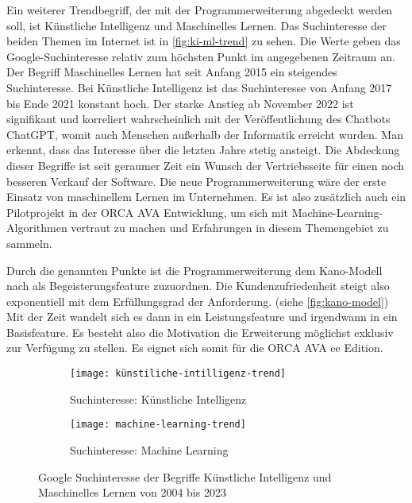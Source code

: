 Ein weiterer Trendbegriff, der mit der Programmerweiterung abgedeckt werden soll, ist \glqq Künstliche Intelligenz\grqq{} und \glqq Maschinelles Lernen\grqq{}. Das Suchinteresse der beiden Themen im Internet ist in \autoref{fig:ki-ml-trend} zu sehen. Die Werte geben das Google-Suchinteresse relativ zum höchsten Punkt im angegebenen Zeitraum an. Der Begriff \glqq Maschinelles Lernen\grqq{} hat seit Anfang 2015 ein steigendes Suchinteresse. Bei \glqq Künstliche Intelligenz\grqq{} ist das Suchinteresse von Anfang 2017 bis Ende 2021 konstant hoch. Der starke Anstieg ab November 2022 ist signifikant und korreliert wahrscheinlich mit der Veröffentlichung des Chatbots ChatGPT, womit auch Menschen außerhalb der Informatik erreicht wurden. Man erkennt, dass das Interesse über die letzten Jahre stetig ansteigt. Die Abdeckung dieser Begriffe ist seit geraumer Zeit ein Wunsch der Vertriebsseite für einen noch besseren Verkauf der Software. Die neue Programmerweiterung wäre der erste Einsatz von maschinellem Lernen im Unternehmen. Es ist also zusätzlich auch ein Pilotprojekt in der ORCA AVA Entwicklung, um sich mit Machine-Learning-Algorithmen vertraut zu machen und Erfahrungen in diesem Themengebiet zu sammeln. 

Durch die genannten Punkte ist die Programmerweiterung dem Kano-Modell nach als Begeisterungsfeature zuzuordnen. Die Kundenzufriedenheit steigt also exponentiell mit dem Erfüllungsgrad der Anforderung. (siehe \autoref{fig:kano-model}) Mit der Zeit wandelt sich es dann in ein Leistungsfeature und irgendwann in ein Basisfeature. \citep[vgl.][p.~3-4]{Hölzing_2008} Es besteht also die Motivation die Erweiterung möglichst exklusiv zur Verfügung zu stellen. Es eignet sich somit für die ORCA AVA \ac{ee} Edition.

\begin{figure}[h]
	\centering
	
	\begin{subfigure}{0.99\textwidth}
		\centering
	\texttt{[image: künstiliche-intilligenz-trend]}
		\caption{Suchinteresse: Künstliche Intelligenz}
		\label{FIG:ki-trend}
	\end{subfigure}
	\hspace{1cm}
	\begin{subfigure}{0.99\textwidth}
		\centering
	\texttt{[image: machine-learning-trend]}
		\caption{Suchinteresse: Machine Learning}
		\label{FIG:ml-trend}
	\end{subfigure}
	
	\caption[Suchinteresse von \glqq Künstliche Intelligenz\grqq{} und \glqq Maschinelles Lernen\grqq{}]{Google Suchinteresse der Begriffe \glqq Künstliche Intelligenz\grqq{} und \glqq Maschinelles Lernen\grqq{} von 2004 bis 2023}
	\label{fig:ki-ml-trend}
\end{figure}

